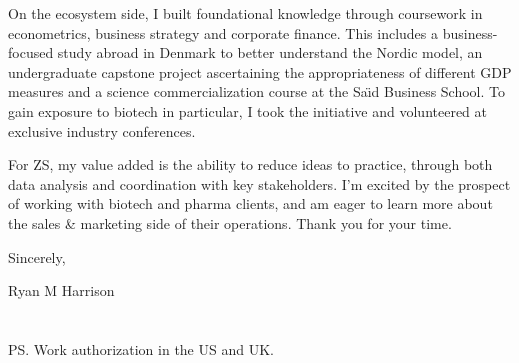 \documentclass[a4paper]{../res}
\begin{document}
\begin{sloppypar}
\begin{resume}
On the ecosystem side, I built foundational knowledge through coursework in econometrics, business strategy and corporate finance. This includes a business-focused study abroad in Denmark to better understand the Nordic model, an undergraduate capstone project ascertaining the appropriateness of different GDP measures and a science commercialization course at the Sa\"\i d Business School. To gain exposure to biotech in particular, I took the initiative and volunteered at exclusive industry conferences.



For ZS, my value added is the ability to reduce ideas to practice, through both data analysis and coordination with key stakeholders. I'm excited by the prospect of working with biotech and pharma clients, and am eager to learn more about the sales \& marketing side of their operations. Thank you for your time.



\vspace{1\baselineskip}
Sincerely,
\vspace{2\baselineskip}

Ryan M Harrison \\ \\ \\
PS. Work authorization in the US and UK.

\end{resume} 
\end{sloppypar}
\end{document}
